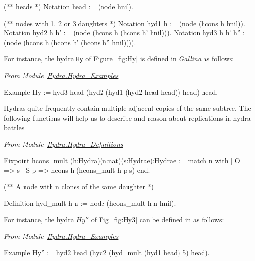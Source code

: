 \begin{Coqsrc}
(** heads *)
Notation head := (node hnil).
 
(** nodes  with 1, 2 or 3 daughters *)
Notation hyd1 h := (node (hcons h hnil)).
Notation hyd2 h h' := (node (hcons h (hcons h' hnil))).
Notation hyd3 h h' h'' := 
                   (node (hcons h (hcons h' (hcons h'' hnil)))).
\end{Coqsrc}


For instance, the hydra \texttt{Hy}  of Figure~\vref{fig:Hy} is defined in \emph{Gallina} as follows:

\vspace{4mm}
\noindent
\emph{From Module~\href{../theories/html/hydras.Hydra.Hydra_Examples.html\#Hy}{Hydra.Hydra\_Examples}}

\begin{Coqsrc}
Example Hy := hyd3 head
                   (hyd2
                      (hyd1 
                         (hyd2 head head))
                      head) 
                   head.
\end{Coqsrc}



Hydras quite frequently contain  multiple adjacent  copies of the same subtree. The following functions
will help us to describe and reason about replications in hydra battles.

\vspace{4pt}
\noindent
\emph{From Module~\href{../theories/html/hydras.Hydra.Hydra_Definitions.html\#hcons_mult}{Hydra.Hydra\_Definitions}}

\begin{Coqsrc}
Fixpoint hcons_mult (h:Hydra)(n:nat)(s:Hydrae):Hydrae :=
  match n with 
  | O => s
  | S p => hcons h (hcons_mult h p s)
  end.

(** A node with n clones of the same daughter *)

Definition hyd_mult h n :=
  node (hcons_mult h n hnil).
\end{Coqsrc}

\vspace{4mm}



For instance, the hydra $Hy''$ of Fig~\vref{fig:Hy3}  can be defined in \coq{} as follows:

\vspace{4pt}
\noindent
\emph{From Module~\href{../theories/html/hydras.Hydra.Hydra_Examples.html}{Hydra.Hydra\_Examples}}

\begin{Coqsrc}
Example Hy'' := 
     hyd2 head
          (hyd2 (hyd_mult (hyd1 head) 5)
                head).
\end{Coqsrc}




